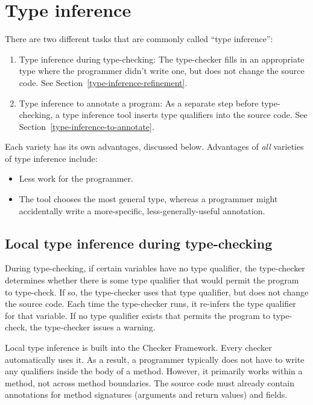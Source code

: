 \htmlhr
\chapter{Type inference\label{type-inference}}

There are two different tasks that are commonly called ``type inference'':
\begin{enumerate}
\item
  Type inference during type-checking:
  The type-checker fills in an appropriate type where the programmer didn't
  write one, but does not change the source code.
  See Section~\ref{type-inference-refinement}.
\item
  Type inference to annotate a program:
  As a separate step before type-checking, a type inference tool
  inserts type qualifiers into the source code.
  See Section~\ref{type-inference-to-annotate}.
\end{enumerate}

Each variety has its own advantages, discussed below.
Advantages of \emph{all} varieties of type inference include:
\begin{itemize}
\item
  Less work for the programmer.
\item
  The tool chooses the most general type, whereas a programmer might
  accidentally write a more-specific, less-generally-useful annotation.
\end{itemize}


\section{Local type inference during type-checking\label{type-inference-refinement}}

During type-checking, if certain variables have no type qualifier, the
type-checker determines whether there is some type qualifier that would
permit the program to type-check.  If so, the type-checker uses that type
qualifier, but does not change the source code.  Each time the
type-checker runs, it re-infers the type qualifier for that variable.  If
no type qualifier exists that permits the program to type-check, the
type-checker issues a warning.

Local type inference is built into the Checker Framework.
Every checker automatically uses it.  As a result, a programmer typically
does not have to write any qualifiers inside the body of a method.
However, it primarily
works within a method, not across method boundaries.
The source code must already contain annotations for method
signatures (arguments and return values) and fields.

